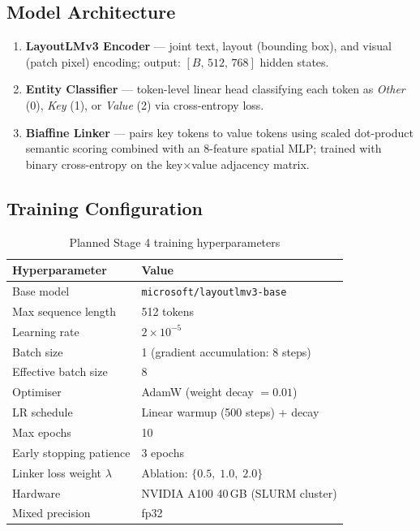 \documentclass[11pt,a4paper]{article}
\begin{document}
\subsection*{Model Architecture}
\begin{enumerate}[noitemsep]
  \item \textbf{LayoutLMv3 Encoder} --- joint text, layout (bounding box),
        and visual (patch pixel) encoding; output: $[B,\,512,\,768]$
        hidden states.
  \item \textbf{Entity Classifier} --- token-level linear head classifying
        each token as \textit{Other} (0), \textit{Key} (1), or
        \textit{Value} (2) via cross-entropy loss.
  \item \textbf{Biaffine Linker} --- pairs key tokens to value tokens using
        scaled dot-product semantic scoring combined with an 8-feature
        spatial MLP; trained with binary cross-entropy on the
        key$\times$value adjacency matrix.
\end{enumerate}

\subsection*{Training Configuration}

\begin{table}[h!]
  \centering
  \caption{Planned Stage 4 training hyperparameters}
  \label{tab:hparams}
  \begin{tabular}{ll}
    \toprule
    \textbf{Hyperparameter}          & \textbf{Value} \\
    \midrule
    Base model                       & \texttt{microsoft/layoutlmv3-base} \\
    Max sequence length              & 512 tokens \\
    Learning rate                    & $2 \times 10^{-5}$ \\
    Batch size                       & 1 (gradient accumulation: 8 steps) \\
    Effective batch size             & 8 \\
    Optimiser                        & AdamW (weight decay $= 0.01$) \\
    LR schedule                      & Linear warmup (500 steps) + decay \\
    Max epochs                       & 10 \\
    Early stopping patience          & 3 epochs \\
    Linker loss weight $\lambda$     & Ablation: $\{0.5,\;1.0,\;2.0\}$ \\
    Hardware                         & NVIDIA A100 40\,GB (SLURM cluster) \\
    Mixed precision                  & fp32 \\
    \bottomrule
  \end{tabular}
\end{table}
\end{document}
